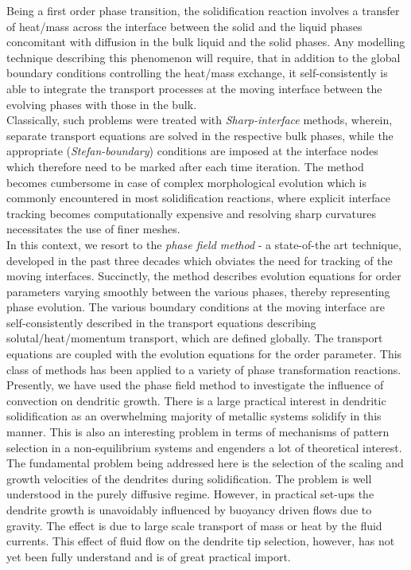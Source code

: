 \documentclass[a4paper]{report}
\begin{document}
Being a first order phase transition, the solidification reaction involves a transfer of heat/mass across the 
interface between the solid and the liquid phases concomitant with diffusion in the bulk liquid and the solid 
phases. Any modelling technique describing this phenomenon will require, that in addition to the global boundary 
conditions controlling the heat/mass exchange, it self-consistently is able to integrate the transport processes 
at the moving interface between the evolving phases with those in the bulk.\\

Classically, such problems were treated with \textit{Sharp-interface} methods, wherein, separate transport
equations are solved in the respective bulk phases, while the appropriate (\textit{Stefan-boundary}) conditions
are imposed at the interface nodes which therefore need to be marked after each time iteration. 
The method becomes cumbersome in case of complex morphological evolution which is commonly encountered
in most solidification reactions, where explicit interface tracking becomes computationally expensive and
resolving sharp curvatures necessitates the use of finer meshes.\\

In this context, we resort to the \textit{phase field method} - a state-of-the art technique, 
developed in the past three decades which obviates the need for tracking of the moving interfaces.
Succinctly, the method describes evolution equations for order parameters varying
smoothly between the various phases, thereby representing phase evolution. The various 
boundary conditions at the moving interface are self-consistently described in the 
transport equations describing solutal/heat/momentum transport, which are defined globally.
The transport equations are coupled with the evolution equations for the order parameter.
This class of methods has been applied to a variety of phase transformation reactions.\\

Presently, we have used the phase field method to investigate the influence of convection on 
dendritic growth. There is a large practical interest in dendritic solidification as an overwhelming 
majority of metallic systems solidify in this manner. This is also an interesting problem in terms of 
mechanisms of pattern selection in a non-equilibrium systems and engenders a lot of theoretical 
interest.\\

The fundamental problem being addressed here is the selection of the scaling and growth velocities 
of the dendrites during solidification. The problem is well understood in the purely 
diffusive regime. However, in practical set-ups the dendrite growth is unavoidably influenced 
by buoyancy driven flows due to gravity. The effect is due to large scale transport of mass 
or heat by the fluid currents. This effect of fluid flow on the dendrite tip selection, however, 
has not yet been fully understand and is of great practical import. 
\end{document}
